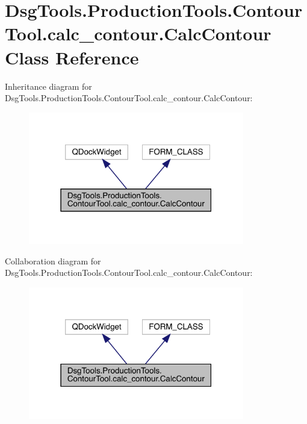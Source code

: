 \hypertarget{class_dsg_tools_1_1_production_tools_1_1_contour_tool_1_1calc__contour_1_1_calc_contour}{}\section{Dsg\+Tools.\+Production\+Tools.\+Contour\+Tool.\+calc\+\_\+contour.\+Calc\+Contour Class Reference}
\label{class_dsg_tools_1_1_production_tools_1_1_contour_tool_1_1calc__contour_1_1_calc_contour}


Inheritance diagram for Dsg\+Tools.\+Production\+Tools.\+Contour\+Tool.\+calc\+\_\+contour.\+Calc\+Contour\+:
\nopagebreak
\begin{figure}[H]
\begin{center}
\leavevmode
\includegraphics[width=267pt]{class_dsg_tools_1_1_production_tools_1_1_contour_tool_1_1calc__contour_1_1_calc_contour__inherit__graph}
\end{center}
\end{figure}


Collaboration diagram for Dsg\+Tools.\+Production\+Tools.\+Contour\+Tool.\+calc\+\_\+contour.\+Calc\+Contour\+:
\nopagebreak
\begin{figure}[H]
\begin{center}
\leavevmode
\includegraphics[width=267pt]{class_dsg_tools_1_1_production_tools_1_1_contour_tool_1_1calc__contour_1_1_calc_contour__coll__graph}
\end{center}
\end{figure}
